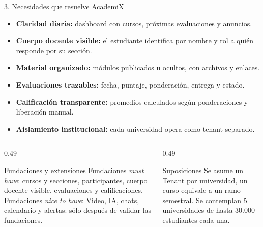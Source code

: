 \documentclass[aspectratio=169,10pt]{beamer}
\begin{document}
\begin{frame}{3. Necesidades que resuelve AcademiX}
\small
\begin{itemize}
  \item \textbf{Claridad diaria:} dashboard con cursos, próximas evaluaciones y anuncios.
  \item \textbf{Cuerpo docente visible:} el estudiante identifica por nombre y rol a quién responde por su sección.
  \item \textbf{Material organizado:} módulos publicados u ocultos, con archivos y enlaces.
  \item \textbf{Evaluaciones trazables:} fecha, puntaje, ponderación, entrega y estado.
  \item \textbf{Calificación transparente:} promedios calculados según ponderaciones y liberación manual.
  \item \textbf{Aislamiento institucional:} cada universidad opera como tenant separado.
\end{itemize}
\vspace{0.1cm}
\begin{columns}[T,onlytextwidth]
\begin{column}{0.49\textwidth}
\begin{block}{Fundaciones y extensiones}
\footnotesize Fundaciones \emph{must have}: cursos y secciones, participantes, cuerpo docente visible, evaluaciones y calificaciones. Fundaciones \emph{nice to have}: Video, IA, chats, calendario y alertas: sólo después de validar las fundaciones.
\end{block}
\end{column}
\begin{column}{0.49\textwidth}
\begin{block}{Suposiciones}
\footnotesize Se asume un Tenant por universidad, un curso equivale a un ramo semestral. Se contemplan 5 universidades de hasta 30.000 estudiantes cada una.
\end{block}
\end{column}
\end{columns}
\end{frame}
\end{document}
